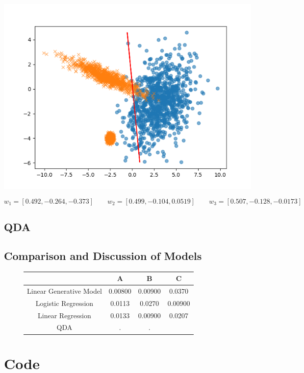 \begin{center}
\includegraphics[height= 0.3\textheight]{LinearRegression2.png}
\end{center}

\begin{equation}
w_1 = [ 0.492, -0.264, -0.373] \qquad
w_2 = [ 0.499, -0.104,  0.0519] \qquad
w_3 = [ 0.507, -0.128, -0.0173]
\end{equation}
\clearpage

\subsection{QDA}
\clearpage

\subsection{Comparison and Discussion of Models}
\begin{figure}[htbp!]
\begin{center}
\begin{tabular}{| c | c | c | c |}
\hline
&A & B & C\\
\hline
Linear Generative Model &0.00800& 0.00900 & 0.0370\\
\hline
Logistic Regression & 0.0113 &  0.0270 & 0.00900\\
\hline
Linear Regression & 0.0133 & 0.00900 & 0.0207\\
\hline
QDA & . & . &\\
\hline
\end{tabular}
\end{center}
\end{figure}

\clearpage
\section{Code}









